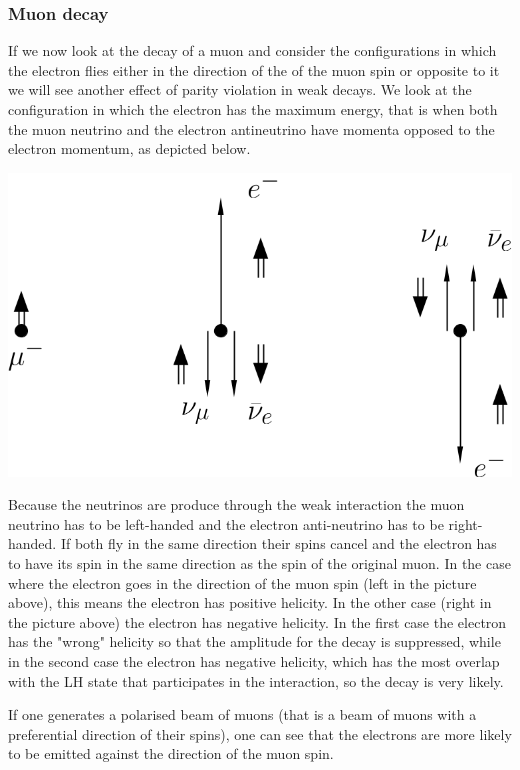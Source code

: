 \documentclass[12pt]{article}
\begin{document}
\subsubsection{Muon decay}
If we now look at the decay of a muon and consider the configurations in which the electron flies either in the direction of the of the muon spin or opposite to it we will see another effect of parity violation in weak decays. We look at the configuration in which the electron has the maximum energy, that is when both the muon neutrino and the electron antineutrino have momenta opposed to the electron momentum, as depicted below.
\begin{center}
\includegraphics[scale=0.4]{images/MuonDecay.png}
\end{center}
Because the neutrinos are produce through the weak interaction the muon neutrino has to be left-handed and the electron anti-neutrino has to be right-handed. If both fly in the same direction their spins cancel and the electron has to have its spin in the same direction as the spin of the original muon. In the case where the electron goes in the direction of the muon spin (left in the picture above), this means the electron has positive helicity. In the other case (right in the picture above) the electron has negative helicity. In the first case the electron has the "wrong" helicity so that the amplitude for the decay is suppressed, while in the second case the electron has negative helicity, which has the most overlap with the LH state that participates in the interaction, so the decay is very likely. 

If one generates a polarised beam of muons (that is a beam of muons with a preferential direction of their spins), one can see that the electrons are more likely to be emitted against the direction of the muon spin.
%
\end{document}
